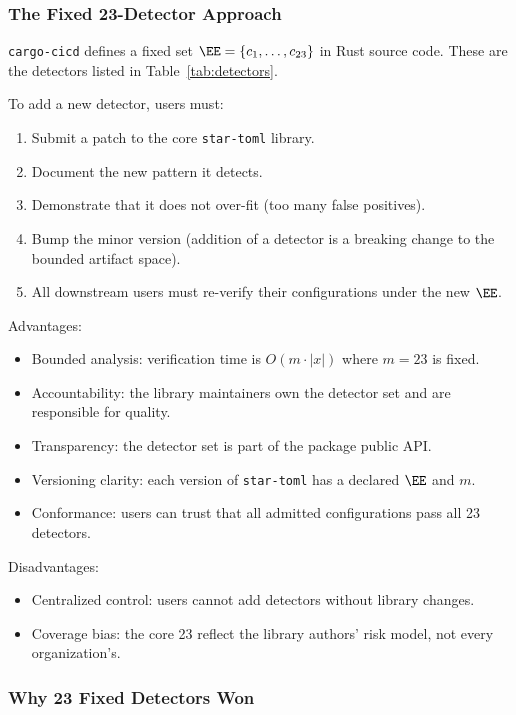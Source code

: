 \subsubsection{The Fixed 23-Detector Approach}

\texttt{cargo-cicd} defines a fixed set $\EE = \{c_1, \ldots, c_{23}\}$ in Rust source code. These are the detectors listed in Table~\ref{tab:detectors}.

To add a new detector, users must:
\begin{enumerate}
  \item Submit a patch to the core \texttt{star-toml} library.
  \item Document the new pattern it detects.
  \item Demonstrate that it does not over-fit (too many false positives).
  \item Bump the minor version (addition of a detector is a breaking change to the bounded artifact space).
  \item All downstream users must re-verify their configurations under the new $\EE$.
\end{enumerate}

Advantages:
\begin{itemize}
  \item Bounded analysis: verification time is $O(m \cdot |x|)$ where $m = 23$ is fixed.
  \item Accountability: the library maintainers own the detector set and are responsible for quality.
  \item Transparency: the detector set is part of the package public API.
  \item Versioning clarity: each version of \texttt{star-toml} has a declared $\EE$ and $m$.
  \item Conformance: users can trust that all admitted configurations pass all 23 detectors.
\end{itemize}

Disadvantages:
\begin{itemize}
  \item Centralized control: users cannot add detectors without library changes.
  \item Coverage bias: the core 23 reflect the library authors' risk model, not every organization's.
\end{itemize}

\subsubsection{Why 23 Fixed Detectors Won}

